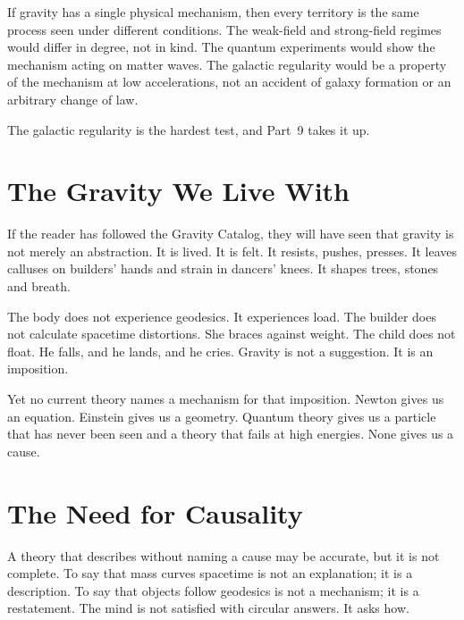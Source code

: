 \documentclass[11pt,a4paper]{article}
\begin{document}
If gravity has a single physical mechanism, then every territory is the same process seen under different conditions. The weak-field and strong-field regimes would differ in degree, not in kind. The quantum experiments would show the mechanism acting on matter waves. The galactic regularity would be a property of the mechanism at low accelerations, not an accident of galaxy formation or an arbitrary change of law. 

  The galactic regularity is the hardest test, and Part~9 takes it up.

\section{The Gravity We Live With}

If the reader has followed the Gravity Catalog, they will have seen that gravity is not merely an abstraction. It is lived. It is felt. It resists, pushes, presses. It leaves calluses on builders' hands and strain in dancers' knees. It shapes trees, stones and breath.

The body does not experience geodesics. It experiences load. The builder does not calculate spacetime distortions. She braces against weight. The child does not float. He falls, and he lands, and he cries. Gravity is not a suggestion. It is an imposition.

Yet no current theory names a mechanism for that imposition. Newton gives us an equation. Einstein gives us a geometry. Quantum theory gives us a particle that has never been seen and a theory that fails at high energies. None gives us a cause.

\section{The Need for Causality}

A theory that describes without naming a cause may be accurate, but it is not complete. To say that mass curves spacetime is not an explanation; it is a description. To say that objects follow geodesics is not a mechanism; it is a restatement. The mind is not satisfied with circular answers. It asks how.
\end{document}
